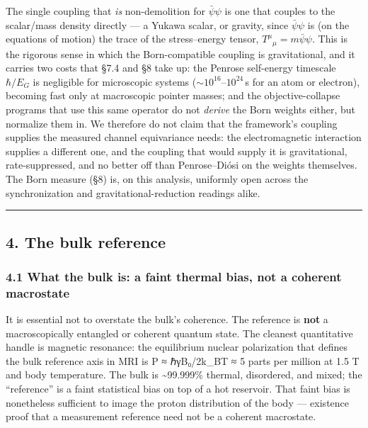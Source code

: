 \documentclass[
]{article}
\newcounter{none} %
\begin{document}
The single coupling that \emph{is} non-demolition for \(\bar\psi\psi\)
is one that couples to the scalar/mass density directly --- a Yukawa
scalar, or gravity, since \(\bar\psi\psi\) is (on the equations of
motion) the trace of the stress--energy tensor,
\(T^\mu{}_\mu=m\bar\psi\psi\). This is the rigorous sense in which the
Born-compatible coupling is gravitational, and it carries two costs that
§7.4 and §8 take up: the Penrose self-energy timescale \(\hbar/E_G\) is
negligible for microscopic systems (\(\sim 10^{16}\)--\(10^{24}\,\)s for
an atom or electron), becoming fast only at macroscopic pointer masses;
and the objective-collapse programs that use this same operator do not
\emph{derive} the Born weights either, but normalize them in. We
therefore do not claim that the framework's coupling supplies the
measured channel equivariance needs: the electromagnetic interaction
supplies a different one, and the coupling that would supply it is
gravitational, rate-suppressed, and no better off than Penrose--Diósi on
the weights themselves. The Born measure (§8) is, on this analysis,
uniformly open across the synchronization and gravitational-reduction
readings alike.

\begin{center}\rule{0.5\linewidth}{0.5pt}\end{center}

\subsection{4. The bulk reference}\label{the-bulk-reference}

\subsubsection{4.1 What the bulk is: a faint thermal bias, not a
coherent
macrostate}\label{what-the-bulk-is-a-faint-thermal-bias-not-a-coherent-macrostate}

It is essential not to overstate the bulk's coherence. The reference is
\textbf{not} a macroscopically entangled or coherent quantum state. The
cleanest quantitative handle is magnetic resonance: the equilibrium
nuclear polarization that defines the bulk reference axis in MRI is P ≈
ℏγB₀/2k\_BT ≈ 5 parts per million at 1.5 T and body temperature. The
bulk is \textasciitilde99.999\% thermal, disordered, and mixed; the
``reference'' is a faint statistical bias on top of a hot reservoir.
That faint bias is nonetheless sufficient to image the proton
distribution of the body --- existence proof that a measurement
reference need not be a coherent macrostate.
\end{document}
